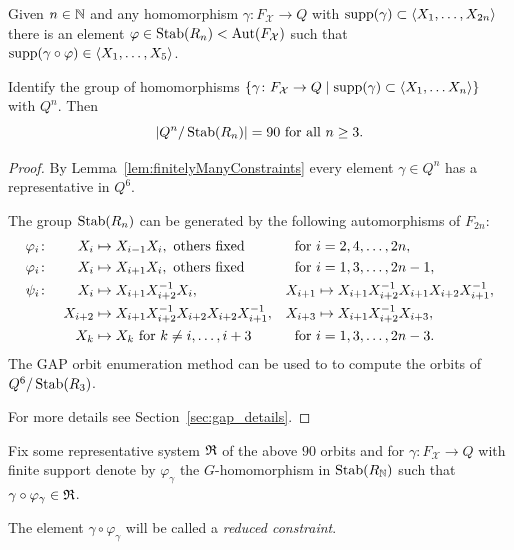 \documentclass[a4paper,11pt]{amsart}
\begin{document}
\begin{lem}\label{lem:finitelyManyConstraints}
 Given $n\in \mathbb{N}$ and any homomorphism $\gamma\colon F_{\mathcal{X}} \to Q$ with $\operatorname{{supp}}(\gamma) \subset \left<X_1,\ldots ,X_{2n}\right>$
 there is an element $\varphi \in \operatorname{Stab}(R_n)<\operatorname{{Aut}}(F_{\mathcal{X}})$ such that $\operatorname{{supp}}(\gamma\circ\varphi) \in \left<X_1,\dotsc,X_5\right>$.
\end{lem}
\begin{lem}\label{lem:90Constraints}
 Identify the group of homomorphisms $\{\gamma \colon F_{\mathcal{X}} \to Q \mid \operatorname{{supp}}(\gamma) \subset \left<X_1,\ldots X_n\right>\}$ with $Q^n$. 
 Then \[\left|{Q^n/\operatorname{Stab}(R_n)}\right|=90 \text{ for all } n\geq 3	.\]
\end{lem}
\begin{proof}
By Lemma~\ref{lem:finitelyManyConstraints} every element $\gamma\in Q^n$ has a representative in $Q^6$.

 The group $\operatorname{Stab}(R_n)$ can be generated by the 
 following automorphisms of $F_{2n}$:
 \begin{align*}
  \varphi_i&\colon& X_i&\mapsto X_{i-1}X_i, \textup{ others fixed} & \textup{for }&i=2,4,\dotsc,2n , \\
  \varphi_i&\colon&X_i&\mapsto X_{i+1}X_i, \textup{ others fixed} & \textup{for }&i=1,3,\dotsc,2n-1 ,\\
  \psi_i&\colon&X_i&\mapsto X_{i+1}X_{i+2}^{-1}X_i, &X_{i+1}&\mapsto X_{i+1}X_{i+2}^{-1}X_{i+1}X_{i+2}X_{i+1}^{-1},\\  
  &&X_{i+2}&\mapsto X_{i+1}X_{i+2}^{-1}X_{i+2}X_{i+2}X_{i+1}^{-1}, &X_{i+3}&\mapsto X_{i+1}X_{i+2}^{-1}X_{i+3},\\
  &&X_k &\mapsto X_k \textup{ for } k\neq i,\dotsc,i+3 & \textup{for }&i=1,3,\dotsc,2n-3 .  
 \end{align*}
 The GAP orbit enumeration method  can be used to 
 to compute the orbits of ${Q^6/\operatorname{Stab}(R_3)}$.
 
 For more details see Section~\ref{sec:gap_details}.
\end{proof}
 Fix some representative system $\mathfrak{R}$ of the above $90$ orbits and for 
 $\gamma \colon F_{\mathcal{X}} \to Q$ with finite support denote by $\varphi_\gamma$ the $G$-homomorphism 
 in $\operatorname{Stab}(R_{\mathbb{N}})$ such that $\gamma\circ \varphi_\gamma \in \mathfrak{R}$.
 
 The element $\gamma \circ \varphi_\gamma$ will be called a \emph{reduced constraint}.
\end{document}
